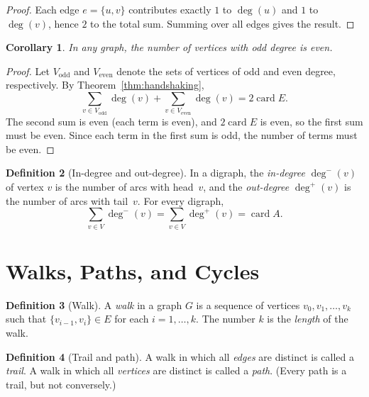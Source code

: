 \documentclass[12pt,a4paper,openany]{book}
\theoremstyle{definition}
\newtheorem{definition}{Definition}[chapter]
\theoremstyle{plain}
\newtheorem{corollary}[definition]{Corollary}
\theoremstyle{remark}
\DeclareMathOperator{\card}{card}
\begin{document}
\begin{proof}
Each edge $e = \{u, v\}$ contributes exactly $1$ to $\deg(u)$ and $1$
to $\deg(v)$, hence $2$ to the total sum.  Summing over all edges gives
the result.
\end{proof}

\begin{corollary}\label{cor:even-odd-vertices}
In any graph, the number of vertices with odd degree is even.
\end{corollary}

\begin{proof}
Let $V_{\mathrm{odd}}$ and $V_{\mathrm{even}}$ denote the sets of
vertices of odd and even degree, respectively.  By
Theorem~\ref{thm:handshaking},
\[
   \sum_{v \in V_{\mathrm{odd}}} \deg(v)
   + \sum_{v \in V_{\mathrm{even}}} \deg(v) = 2\card{E}.
\]
The second sum is even (each term is even), and $2\card{E}$ is even, so
the first sum must be even.  Since each term in the first sum is odd,
the number of terms must be even.
\end{proof}

\begin{definition}[In-degree and out-degree]\label{def:in-out-degree}
In a digraph, the \emph{in-degree} $\deg^-(v)$ of vertex $v$ is the
number of arcs with head~$v$, and the \emph{out-degree} $\deg^+(v)$ is
the number of arcs with tail~$v$.  For every digraph,
\[
   \sum_{v \in V} \deg^-(v) = \sum_{v \in V} \deg^+(v) = \card{A}.
\]
\end{definition}

\section{Walks, Paths, and Cycles}\label{sec:paths-cycles}

\begin{definition}[Walk]\label{def:walk}
A \emph{walk} in a graph $G$ is a sequence of vertices
$v_0, v_1, \dots, v_k$ such that $\{v_{i-1}, v_i\} \in E$ for each
$i = 1, \dots, k$.  The number $k$ is the \emph{length} of the walk.
\end{definition}

\begin{definition}[Trail and path]\label{def:trail-path}
A walk in which all \emph{edges} are distinct is called a \emph{trail}.
A walk in which all \emph{vertices} are distinct is called a \emph{path}.
(Every path is a trail, but not conversely.)
\end{definition}
\end{document}
